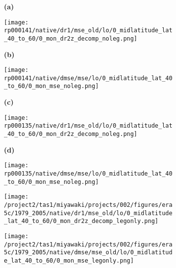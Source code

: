 \documentclass[preview]{standalone}
\begin{document}
\begin{figure}
  \begin{subfigure}[t]{0.05\textwidth}
    \textbf{\normalsize{(a)}}
  \end{subfigure}
  \begin{subfigure}[t]{0.45\textwidth}
    \texttt{[image: rp000141/native/dr1/mse\_old/lo/0\_midlatitude\_lat\_40\_to\_60/0\_mon\_dr2z\_decomp\_noleg.png]}
  \end{subfigure}
  \begin{subfigure}[t]{0.05\textwidth}
    \textbf{\normalsize{(b)}}
  \end{subfigure}
  \begin{subfigure}[t]{0.45\textwidth}
    \texttt{[image: rp000141/native/dmse/mse/lo/0\_midlatitude\_lat\_40\_to\_60/0\_mon\_mse\_noleg.png]}
  \end{subfigure}

  \begin{subfigure}[t]{0.05\textwidth}
    \textbf{\normalsize{(c)}}
  \end{subfigure}
  \begin{subfigure}[t]{0.45\textwidth}
    \texttt{[image: rp000135/native/dr1/mse\_old/lo/0\_midlatitude\_lat\_40\_to\_60/0\_mon\_dr2z\_decomp\_noleg.png]}
  \end{subfigure}
  \begin{subfigure}[t]{0.05\textwidth}
    \textbf{\normalsize{(d)}}
  \end{subfigure}
  \begin{subfigure}[t]{0.45\textwidth}
    \texttt{[image: rp000135/native/dmse/mse/lo/0\_midlatitude\_lat\_40\_to\_60/0\_mon\_mse\_noleg.png]}
  \end{subfigure}

  \begin{subfigure}[t]{0.05\textwidth}
  \end{subfigure}
  \begin{subfigure}[t]{0.45\textwidth}
    \texttt{[image: /project2/tas1/miyawaki/projects/002/figures/era5c/1979\_2005/native/dr1/mse\_old/lo/0\_midlatitude\_lat\_40\_to\_60/0\_mon\_dr2z\_decomp\_legonly.png]}
  \end{subfigure}
  \begin{subfigure}[t]{0.1\textwidth}
  \end{subfigure}
  \begin{subfigure}[t]{0.4\textwidth}
    \texttt{[image: /project2/tas1/miyawaki/projects/002/figures/era5c/1979\_2005/native/dmse/mse\_old/lo/0\_midlatitude\_lat\_40\_to\_60/0\_mon\_mse\_legonly.png]}
  \end{subfigure}

\end{figure}
\end{document}
